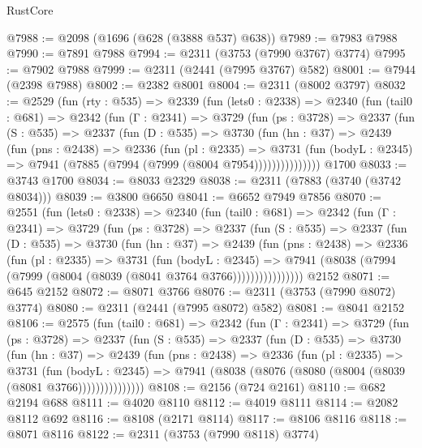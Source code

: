 \begin{lexlean}{RustCore}
\begin{coremodule}
@7988 := @2098 (@1696 (@628 (@3888 @537) @638))
@7989 := @7983 @7988
@7990 := @7891 @7988
@7994 := @2311 (@3753 (@7990 @3767) @3774)
@7995 := @7902 @7988
@7999 := @2311 (@2441 (@7995 @3767) @582)
@8001 := @7944 (@2398 @7988)
@8002 := @2382 @8001
@8004 := @2311 (@8002 @3797)
@8032 := @2529
    (fun (rty : @535) =>
    @2339
      (fun (lets0 : @2338) =>
      @2340
        (fun (tail0 : @681) =>
        @2342
          (fun (Γ : @2341) =>
          @3729
            (fun (ps : @3728) =>
            @2337
              (fun (S : @535) =>
              @2337
                (fun (D : @535) =>
                @3730
                  (fun (hn : @37) =>
                  @2439
                    (fun (pns : @2438) =>
                    @2336
                      (fun (pl : @2335) =>
                      @3731
                        (fun (bodyL : @2345) =>
                        @7941 (@7885 (@7994 (@7999 (@8004 @7954)))))))))))))))
    @1700
@8033 := @3743 @1700
@8034 := @8033 @2329
@8038 := @2311 (@7883 (@3740 (@3742 @8034)))
@8039 := @3800 @6650
@8041 := @6652 @7949 @7856
@8070 := @2551
    (fun (lets0 : @2338) =>
    @2340
      (fun (tail0 : @681) =>
      @2342
        (fun (Γ : @2341) =>
        @3729
          (fun (ps : @3728) =>
          @2337
            (fun (S : @535) =>
            @2337
              (fun (D : @535) =>
              @3730
                (fun (hn : @37) =>
                @2439
                  (fun (pns : @2438) =>
                  @2336
                    (fun (pl : @2335) =>
                    @3731
                      (fun (bodyL : @2345) =>
                      @7941 (@8038 (@7994 (@7999 (@8004 (@8039 (@8041 @3764 @3766))))))))))))))))
    @2152
@8071 := @645 @2152
@8072 := @8071 @3766
@8076 := @2311 (@3753 (@7990 @8072) @3774)
@8080 := @2311 (@2441 (@7995 @8072) @582)
@8081 := @8041 @2152
@8106 := @2575
    (fun (tail0 : @681) =>
    @2342
      (fun (Γ : @2341) =>
      @3729
        (fun (ps : @3728) =>
        @2337
          (fun (S : @535) =>
          @2337
            (fun (D : @535) =>
            @3730
              (fun (hn : @37) =>
              @2439
                (fun (pns : @2438) =>
                @2336
                  (fun (pl : @2335) =>
                  @3731
                    (fun (bodyL : @2345) =>
                    @7941 (@8038 (@8076 (@8080 (@8004 (@8039 (@8081 @3766)))))))))))))))
@8108 := @2156 (@724 @2161)
@8110 := @682 @2194 @688
@8111 := @4020 @8110
@8112 := @4019 @8111
@8114 := @2082 @8112 @692
@8116 := @8108 (@2171 @8114)
@8117 := @8106 @8116
@8118 := @8071 @8116
@8122 := @2311 (@3753 (@7990 @8118) @3774)

\end{coremodule}
\end{lexlean}
